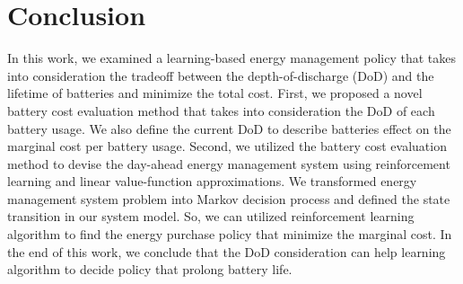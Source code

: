 \chapter{Conclusion}\label{cha:Conclusion}

In this work, we examined a learning-based energy management policy that takes into consideration the tradeoff between the depth-of-discharge (DoD) and the lifetime of batteries and minimize the total cost. First, we proposed a novel battery cost evaluation method that takes into consideration the DoD of each battery usage. We also define the current DoD to describe batteries effect on the marginal cost per battery usage. Second, we utilized the battery cost evaluation method to devise the day-ahead energy management system using reinforcement learning and linear value-function approximations. We transformed energy management system problem into Markov decision process and defined the state transition in our system model. So, we can utilized reinforcement learning algorithm to find the energy purchase policy that minimize the marginal cost. In the end of this work, we conclude that the DoD consideration can help learning algorithm to decide policy that prolong battery life.
